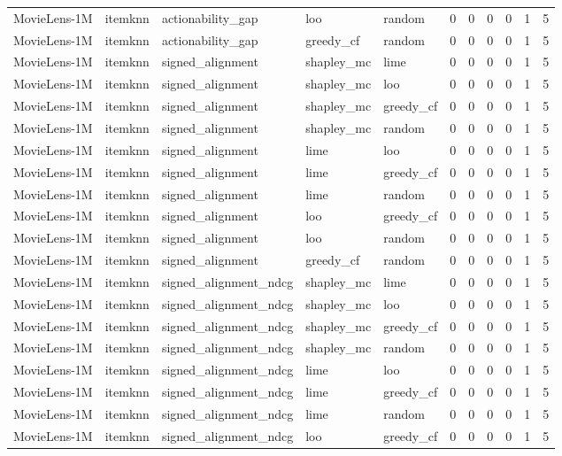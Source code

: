 \begin{table}[t]
{\begin{tabular}{lllllrrrrrr}
MovieLens-1M & itemknn & actionability\_gap & loo & random & 0 & 0 & 0 & 0 & 1 & 5 \\
MovieLens-1M & itemknn & actionability\_gap & greedy\_cf & random & 0 & 0 & 0 & 0 & 1 & 5 \\
MovieLens-1M & itemknn & signed\_alignment & shapley\_mc & lime & 0 & 0 & 0 & 0 & 1 & 5 \\
MovieLens-1M & itemknn & signed\_alignment & shapley\_mc & loo & 0 & 0 & 0 & 0 & 1 & 5 \\
MovieLens-1M & itemknn & signed\_alignment & shapley\_mc & greedy\_cf & 0 & 0 & 0 & 0 & 1 & 5 \\
MovieLens-1M & itemknn & signed\_alignment & shapley\_mc & random & 0 & 0 & 0 & 0 & 1 & 5 \\
MovieLens-1M & itemknn & signed\_alignment & lime & loo & 0 & 0 & 0 & 0 & 1 & 5 \\
MovieLens-1M & itemknn & signed\_alignment & lime & greedy\_cf & 0 & 0 & 0 & 0 & 1 & 5 \\
MovieLens-1M & itemknn & signed\_alignment & lime & random & 0 & 0 & 0 & 0 & 1 & 5 \\
MovieLens-1M & itemknn & signed\_alignment & loo & greedy\_cf & 0 & 0 & 0 & 0 & 1 & 5 \\
MovieLens-1M & itemknn & signed\_alignment & loo & random & 0 & 0 & 0 & 0 & 1 & 5 \\
MovieLens-1M & itemknn & signed\_alignment & greedy\_cf & random & 0 & 0 & 0 & 0 & 1 & 5 \\
MovieLens-1M & itemknn & signed\_alignment\_ndcg & shapley\_mc & lime & 0 & 0 & 0 & 0 & 1 & 5 \\
MovieLens-1M & itemknn & signed\_alignment\_ndcg & shapley\_mc & loo & 0 & 0 & 0 & 0 & 1 & 5 \\
MovieLens-1M & itemknn & signed\_alignment\_ndcg & shapley\_mc & greedy\_cf & 0 & 0 & 0 & 0 & 1 & 5 \\
MovieLens-1M & itemknn & signed\_alignment\_ndcg & shapley\_mc & random & 0 & 0 & 0 & 0 & 1 & 5 \\
MovieLens-1M & itemknn & signed\_alignment\_ndcg & lime & loo & 0 & 0 & 0 & 0 & 1 & 5 \\
MovieLens-1M & itemknn & signed\_alignment\_ndcg & lime & greedy\_cf & 0 & 0 & 0 & 0 & 1 & 5 \\
MovieLens-1M & itemknn & signed\_alignment\_ndcg & lime & random & 0 & 0 & 0 & 0 & 1 & 5 \\
MovieLens-1M & itemknn & signed\_alignment\_ndcg & loo & greedy\_cf & 0 & 0 & 0 & 0 & 1 & 5 \\

\end{tabular}}
\end{table}
